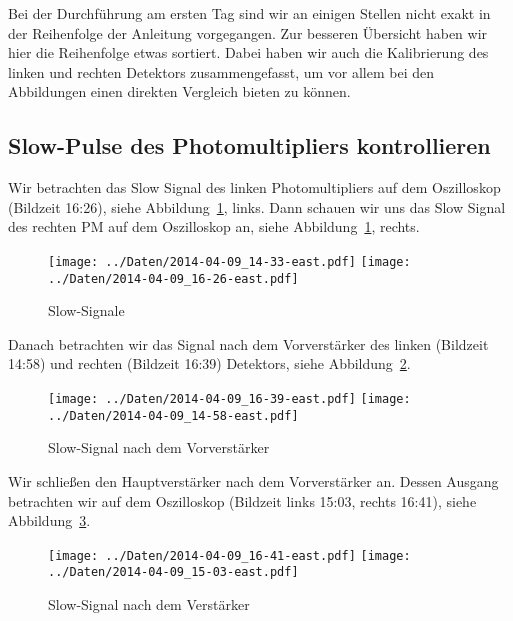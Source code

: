 Bei der Durchführung am ersten Tag sind wir an einigen Stellen nicht exakt in
der Reihenfolge der Anleitung vorgegangen. Zur besseren Übersicht haben wir
hier die Reihenfolge etwas sortiert. Dabei haben wir auch die Kalibrierung des
linken und rechten Detektors zusammengefasst, um vor allem bei den Abbildungen
einen direkten Vergleich bieten zu können.

\subsection{Slow-Pulse des Photomultipliers kontrollieren}

Wir betrachten das Slow Signal des linken Photomultipliers auf dem Oszilloskop
(Bildzeit 16:26), siehe Abbildung~\ref{fig:slow_signal}, links. Dann schauen
wir uns das Slow Signal des rechten PM auf dem Oszilloskop an, siehe
Abbildung~\ref{fig:slow_signal}, rechts.

\begin{figure}[htbp]
    \centering
    \texttt{[image: ../Daten/2014-04-09\_14-33-east.pdf]}
    \hfill
    \texttt{[image: ../Daten/2014-04-09\_16-26-east.pdf]}
    \caption{%
        Slow-Signale
    }
    \label{fig:slow_signal}
\end{figure}

Danach betrachten wir das Signal nach dem Vorverstärker des linken (Bildzeit
14:58) und rechten (Bildzeit 16:39) Detektors, siehe
Abbildung~\ref{fig:slow_pre_amp}.

\begin{figure}[htbp]
    \centering
    \texttt{[image: ../Daten/2014-04-09\_16-39-east.pdf]}
    \hfill
    \texttt{[image: ../Daten/2014-04-09\_14-58-east.pdf]}
    \caption{%
        Slow-Signal nach dem Vorverstärker
    }
    \label{fig:slow_pre_amp}
\end{figure}

Wir schließen den Hauptverstärker nach dem Vorverstärker an. Dessen Ausgang
betrachten wir auf dem Oszilloskop (Bildzeit links 15:03, rechts 16:41), siehe
Abbildung~\ref{fig:slow_amp}.

\begin{figure}[htbp]
    \centering
    \texttt{[image: ../Daten/2014-04-09\_16-41-east.pdf]}
    \hfill
    \texttt{[image: ../Daten/2014-04-09\_15-03-east.pdf]}
    \caption{%
        Slow-Signal nach dem Verstärker
    }
    \label{fig:slow_amp}
\end{figure}

